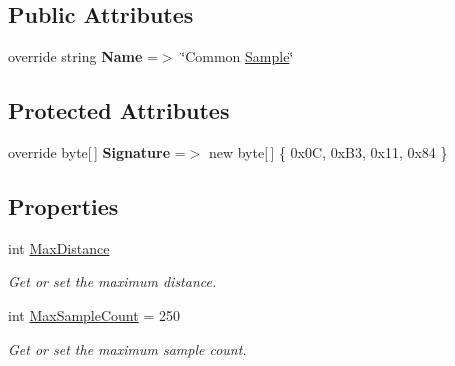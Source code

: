 \subsection*{Public Attributes}
\begin{DoxyCompactItemize}
\item 
override string {\bfseries Name} =$>$ \char`\"{}Common \hyperlink{class_stegosaurus_1_1_algorithm_1_1_common_sample_1_1_sample}{Sample}\char`\"{}\hypertarget{class_stegosaurus_1_1_algorithm_1_1_common_sample_algorithm_ab3e1d3492190d60b10da12120d0bc605}{}\label{class_stegosaurus_1_1_algorithm_1_1_common_sample_algorithm_ab3e1d3492190d60b10da12120d0bc605}

\end{DoxyCompactItemize}
\subsection*{Protected Attributes}
\begin{DoxyCompactItemize}
\item 
override byte\mbox{[}$\,$\mbox{]} {\bfseries Signature} =$>$ new byte\mbox{[}$\,$\mbox{]} \{ 0x0\+C, 0x\+B3, 0x11, 0x84 \}\hypertarget{class_stegosaurus_1_1_algorithm_1_1_common_sample_algorithm_a9f75da812c18f8a57cdfc2aaf1a4959e}{}\label{class_stegosaurus_1_1_algorithm_1_1_common_sample_algorithm_a9f75da812c18f8a57cdfc2aaf1a4959e}

\end{DoxyCompactItemize}
\subsection*{Properties}
\begin{DoxyCompactItemize}
\item 
int \hyperlink{class_stegosaurus_1_1_algorithm_1_1_common_sample_algorithm_a322402dbc9547b7fdde3495cbec11a3b}{Max\+Distance}
\begin{DoxyCompactList}\small\item\em Get or set the maximum distance. \end{DoxyCompactList}\item 
int \hyperlink{class_stegosaurus_1_1_algorithm_1_1_common_sample_algorithm_ae08e3bf46e7f8d2b6aa465ca9a54f0b6}{Max\+Sample\+Count} = 250
\begin{DoxyCompactList}\small\item\em Get or set the maximum sample count. \end{DoxyCompactList}\end{DoxyCompactItemize}


